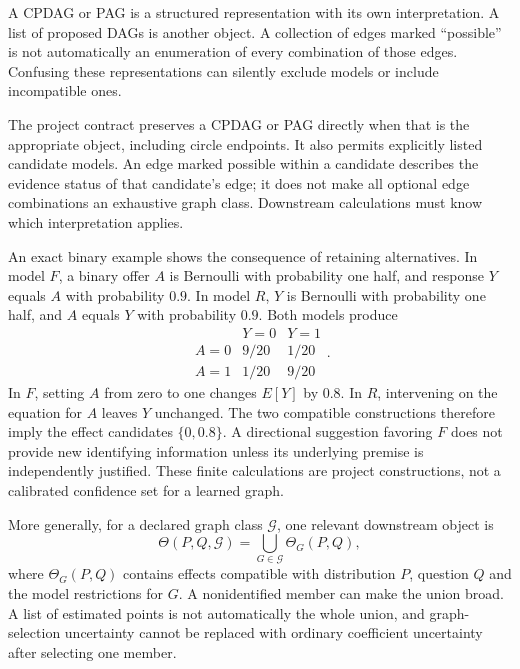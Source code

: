 A CPDAG or PAG is a structured representation with its own interpretation.
A list of proposed DAGs is another object. A collection of edges marked
``possible'' is not automatically an enumeration of every combination of
those edges. Confusing these representations can silently exclude models
or include incompatible ones.

The project contract preserves a CPDAG or PAG directly when that is the
appropriate object, including circle endpoints. It also permits explicitly
listed candidate models. An edge marked possible within a candidate describes
the evidence status of that candidate's edge; it does not make all optional
edge combinations an exhaustive graph class. Downstream calculations must
know which interpretation applies.

An exact binary example shows the consequence of retaining alternatives.
In model \(F\), a binary offer \(A\) is Bernoulli with probability one half,
and response \(Y\) equals \(A\) with probability \(0.9\). In model \(R\),
\(Y\) is Bernoulli with probability one half, and \(A\) equals \(Y\) with
probability \(0.9\). Both models produce
\[
\begin{array}{c|cc}
 &Y=0&Y=1\\\hline
A=0&9/20&1/20\\
A=1&1/20&9/20
\end{array}.
\]
In \(F\), setting \(A\) from zero to one changes \(E[Y]\) by \(0.8\).
In \(R\), intervening on the equation for \(A\) leaves \(Y\) unchanged.
The two compatible constructions therefore imply the effect candidates
\(\{0,0.8\}\). A directional suggestion favoring \(F\) does not provide
new identifying information unless its underlying premise is independently
justified. These finite calculations are project constructions, not a
calibrated confidence set for a learned graph.

More generally, for a declared graph class \(\mathcal G\), one relevant
downstream object is
\begin{equation}
 \Theta(P,Q,\mathcal G)=\bigcup_{G\in\mathcal G}\Theta_G(P,Q),
 \label{la:graph-union}
\end{equation}
where \(\Theta_G(P,Q)\) contains effects compatible with distribution \(P\),
question \(Q\) and the model restrictions for \(G\). A nonidentified member
can make the union broad. A list of estimated points is not automatically
the whole union, and graph-selection uncertainty cannot be replaced with
ordinary coefficient uncertainty after selecting one member.

